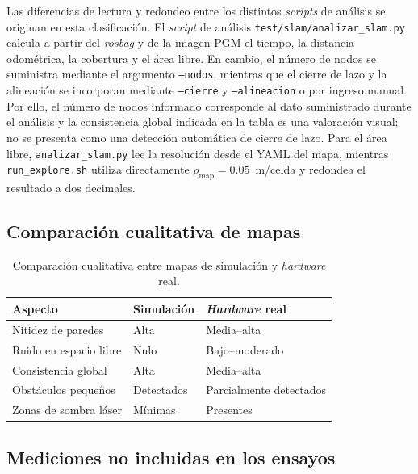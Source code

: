 \begin{appendices}
Las diferencias de lectura y redondeo entre los distintos \textit{scripts} de análisis se originan en esta clasificación. El \textit{script} de análisis \texttt{test/\allowbreak{}slam/\allowbreak{}analizar\_\allowbreak{}slam.\allowbreak{}py} calcula a partir del \textit{rosbag} y de la imagen PGM el tiempo, la distancia odométrica, la cobertura y el área libre. En cambio, el número de nodos se suministra mediante el argumento \texttt{--nodos}, mientras que el cierre de lazo y la alineación se incorporan mediante \texttt{--cierre} y \texttt{--alineacion} o por ingreso manual. Por ello, el número de nodos informado corresponde al dato suministrado durante el análisis y la consistencia global indicada en la tabla es una valoración visual; no se presenta como una detección automática de cierre de lazo. Para el área libre, \texttt{analizar\_slam.py} lee la resolución desde el YAML del mapa, mientras \texttt{run\_explore.sh} utiliza directamente $\rho_{\mathrm{map}}=0.05$~m/celda y redondea el resultado a dos decimales.

\subsection{Comparación cualitativa de mapas}

\begin{table}[H]
\centering
\caption{Comparación cualitativa entre mapas de simulación y \textit{hardware} real.}
\label{tab:diferencias_mapas}
\small
\begin{tabular}{p{4.8cm} p{3.6cm} p{4.6cm}}
\toprule
\textbf{Aspecto} & \textbf{Simulación} & \textbf{\textit{Hardware} real} \\
\midrule
Nitidez de paredes & Alta & Media--alta \\
Ruido en espacio libre & Nulo & Bajo--moderado \\
Consistencia global & Alta & Media--alta \\
Obstáculos pequeños & Detectados & Parcialmente detectados \\
Zonas de sombra láser & Mínimas & Presentes \\
\bottomrule
\end{tabular}
\end{table}

\subsection{Mediciones no incluidas en los ensayos}
\label{anx:mediciones_no_incluidas}


\end{appendices}
